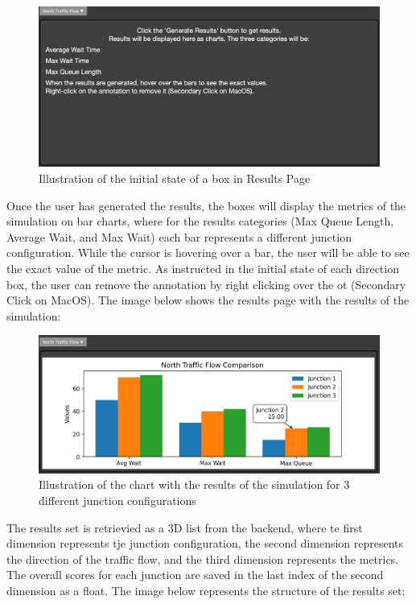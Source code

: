 \documentclass{article}
\begin{document}
    \begin{figure}[H]
        \centering
        \includegraphics[width=\textwidth]{results1.png}
        \caption{Illustration of the initial state of a box in Results Page}
        \label{fig:results1}
    \end{figure}

    Once the user has generated the results, the boxes will display the metrics of the simulation on bar charts, where for the results categories (Max Queue Length, Average Wait, and Max Wait)
    each bar represents a different junction configuration. While the cursor is hovering over a bar, the user will be able to see the exact value of the metric. As instructed in the initial state
    of each direction box, the user can remove the annotation by right clicking over the ot (Secondary Click on MacOS). The image below shows the results page with the results of the simulation:

    \begin{figure}[H]
        \centering
        \includegraphics[width=\textwidth]{results2.png}
        \caption{Illustration of the chart with the results of the simulation for 3 different junction configurations}
        \label{fig:results2}
    \end{figure}

    The results set is retrievied as a 3D list from the backend, where te first dimension represents tje junction configuration, the second dimension represents the direction of the traffic flow, and the third dimension represents the metrics. The overall scores
    for each junction are saved in the last index of the second dimension as a float. The image below represents the structure of the results set:
\end{document}

